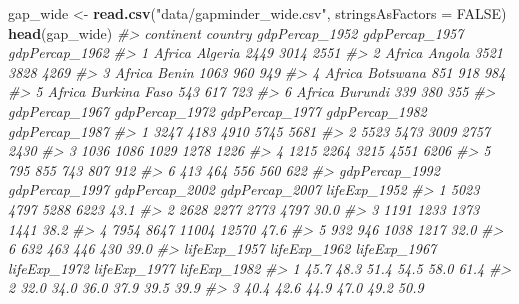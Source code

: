 \documentclass[]{book}
\newenvironment{Shaded}{\begin{snugshade}}{\end{snugshade}}
\newcommand{\KeywordTok}[1]{\textcolor[rgb]{0.13,0.29,0.53}{\textbf{#1}}}
\newcommand{\DataTypeTok}[1]{\textcolor[rgb]{0.13,0.29,0.53}{#1}}
\newcommand{\StringTok}[1]{\textcolor[rgb]{0.31,0.60,0.02}{#1}}
\newcommand{\CommentTok}[1]{\textcolor[rgb]{0.56,0.35,0.01}{\textit{#1}}}
\newcommand{\OtherTok}[1]{\textcolor[rgb]{0.56,0.35,0.01}{#1}}
\newcommand{\NormalTok}[1]{#1}
\begin{document}
\begin{Shaded}
\begin{Highlighting}[]
\NormalTok{gap_wide <-}\StringTok{ }\KeywordTok{read.csv}\NormalTok{(}\StringTok{"data/gapminder_wide.csv"}\NormalTok{, }\DataTypeTok{stringsAsFactors =} \OtherTok{FALSE}\NormalTok{)}
\KeywordTok{head}\NormalTok{(gap_wide)}
\CommentTok{#>   continent      country gdpPercap_1952 gdpPercap_1957 gdpPercap_1962}
\CommentTok{#> 1    Africa      Algeria           2449           3014           2551}
\CommentTok{#> 2    Africa       Angola           3521           3828           4269}
\CommentTok{#> 3    Africa        Benin           1063            960            949}
\CommentTok{#> 4    Africa     Botswana            851            918            984}
\CommentTok{#> 5    Africa Burkina Faso            543            617            723}
\CommentTok{#> 6    Africa      Burundi            339            380            355}
\CommentTok{#>   gdpPercap_1967 gdpPercap_1972 gdpPercap_1977 gdpPercap_1982 gdpPercap_1987}
\CommentTok{#> 1           3247           4183           4910           5745           5681}
\CommentTok{#> 2           5523           5473           3009           2757           2430}
\CommentTok{#> 3           1036           1086           1029           1278           1226}
\CommentTok{#> 4           1215           2264           3215           4551           6206}
\CommentTok{#> 5            795            855            743            807            912}
\CommentTok{#> 6            413            464            556            560            622}
\CommentTok{#>   gdpPercap_1992 gdpPercap_1997 gdpPercap_2002 gdpPercap_2007 lifeExp_1952}
\CommentTok{#> 1           5023           4797           5288           6223         43.1}
\CommentTok{#> 2           2628           2277           2773           4797         30.0}
\CommentTok{#> 3           1191           1233           1373           1441         38.2}
\CommentTok{#> 4           7954           8647          11004          12570         47.6}
\CommentTok{#> 5            932            946           1038           1217         32.0}
\CommentTok{#> 6            632            463            446            430         39.0}
\CommentTok{#>   lifeExp_1957 lifeExp_1962 lifeExp_1967 lifeExp_1972 lifeExp_1977 lifeExp_1982}
\CommentTok{#> 1         45.7         48.3         51.4         54.5         58.0         61.4}
\CommentTok{#> 2         32.0         34.0         36.0         37.9         39.5         39.9}
\CommentTok{#> 3         40.4         42.6         44.9         47.0         49.2         50.9}

\end{Highlighting}
\end{Shaded}
\end{document}
